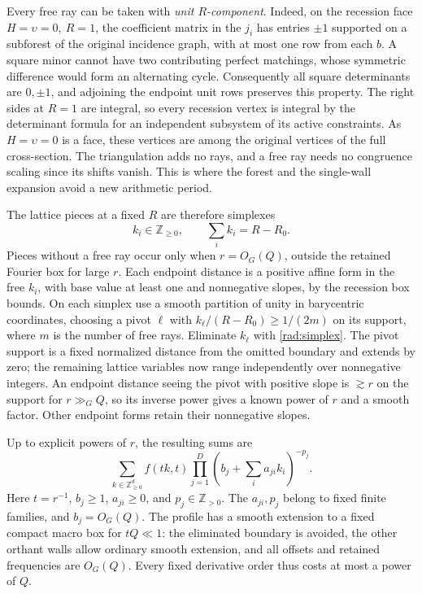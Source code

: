 Every free ray can be taken with \emph{unit \(R\)-component}.
Indeed, on the recession face \(H=\upsilon=0,\ R=1\), the
coefficient matrix in the \(j_i\) has entries \(\pm1\) supported
on a subforest of the original incidence graph, with at most
one row from each \(b\). A square minor cannot have two
contributing perfect matchings, whose symmetric difference
would form an alternating cycle. Consequently all square
determinants are \(0,\pm1\), and adjoining the endpoint unit
rows preserves this property. The right sides at \(R=1\) are
integral, so every recession vertex is integral by the determinant
formula for an independent subsystem of its active constraints.
As \(H=\upsilon=0\) is a face, these vertices are among the
original vertices of the full cross-section. The triangulation
adds no rays, and a free ray needs no congruence scaling since
its shifts vanish. This is where the forest and the single-wall
expansion avoid a new arithmetic period.

The lattice pieces at a fixed \(R\) are therefore simplexes
\begin{equation}
 k_i\in\mathbb Z_{\ge0},\qquad \sum_i k_i=R-R_0 .
 \label{rad:simplex}
\end{equation}
Pieces without a free ray occur only when \(r=O_G(Q)\), outside
the retained Fourier box for large \(r\). Each endpoint distance
is a positive affine form in the free \(k_i\), with base value
at least one and nonnegative slopes, by the recession box bounds.
On each simplex use a smooth partition of unity in barycentric
coordinates, choosing a pivot \(\ell\) with
\(k_\ell/(R-R_0)\ge1/(2m)\) on its support, where \(m\) is the
number of free rays. Eliminate \(k_\ell\) with
\eqref{rad:simplex}. The pivot support is a fixed normalized
distance from the omitted boundary and extends by zero; the
remaining lattice variables now range independently over
nonnegative integers. An endpoint distance seeing the pivot
with positive slope is \(\gtrsim r\) on the support for
\(r\gg_G Q\), so its inverse power gives a known power of \(r\)
and a smooth factor. Other endpoint forms retain their
nonnegative slopes.

Up to explicit powers of \(r\), the resulting sums are
\begin{equation}
 \sum_{k\in\mathbb Z_{\ge0}^d} f(tk,t)
       \prod_{j=1}^{D}\left(b_j+\sum_i a_{ji}k_i\right)^{-p_j}.
 \label{rad:orthant}
\end{equation}
Here \(t=r^{-1}\), \(b_j\ge1\), \(a_{ji}\ge0\), and
\(p_j\in\mathbb Z_{>0}\). The \(a_{ji},p_j\) belong to fixed finite families, and
\(b_j=O_G(Q)\). The profile has a smooth extension to a fixed
compact macro box for \(tQ\ll1\): the eliminated boundary is
avoided, the other orthant walls allow ordinary smooth extension,
and all offsets and retained frequencies are \(O_G(Q)\).
Every fixed derivative order thus costs at most a power of \(Q\).

